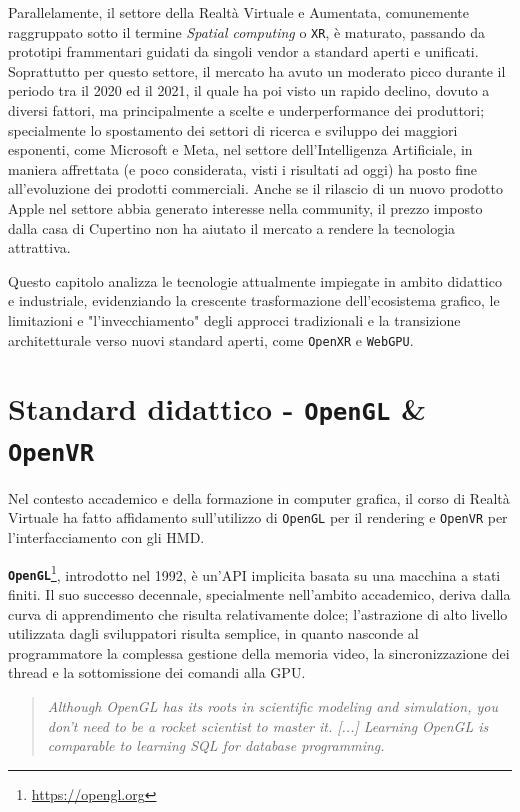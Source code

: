 \documentclass[a4paper, 11pt, twoside]{report}
\begin{document}
Parallelamente, il settore della Realtà Virtuale e Aumentata, comunemente raggruppato sotto il termine \textit{Spatial
computing} o \texttt{XR}, è maturato, passando da prototipi frammentari guidati da singoli vendor a standard aperti e
unificati.
Soprattutto per questo settore, il mercato ha avuto un moderato picco durante il periodo tra il 2020 ed il 2021, il
quale ha poi visto un rapido declino, dovuto a diversi fattori, ma principalmente a scelte e underperformance dei
produttori; specialmente lo spostamento dei settori di ricerca e sviluppo dei maggiori esponenti, come Microsoft e Meta,
nel settore dell'Intelligenza Artificiale, in maniera affrettata (e poco considerata, visti i risultati ad oggi) ha
posto fine all'evoluzione dei prodotti commerciali.
Anche se il rilascio di un nuovo prodotto Apple nel settore abbia generato interesse nella community, il prezzo imposto
dalla casa di Cupertino non ha aiutato il mercato a rendere la tecnologia attrattiva.

Questo capitolo analizza le tecnologie attualmente impiegate in ambito didattico e industriale, evidenziando la
crescente trasformazione dell'ecosistema grafico, le limitazioni e "l'invecchiamento" degli approcci tradizionali e
la transizione architetturale verso nuovi standard aperti, come \texttt{\gls{OpenXR}} e \texttt{WebGPU}.

\newpage

\section{Standard didattico - \texttt{OpenGL} \& \texttt{\gls{OpenVR}}}

Nel contesto accademico e della formazione in computer grafica, il corso di Realtà Virtuale ha fatto affidamento
sull'utilizzo di \texttt{OpenGL} per il rendering e \texttt{\gls{OpenVR}} per l'interfacciamento con gli HMD.

\textbf{\texttt{OpenGL}}\footnote{\url{https://opengl.org}}, introdotto nel 1992, è un'API implicita basata su una
macchina a stati finiti. Il suo successo decennale, specialmente nell'ambito accademico, deriva dalla curva di
apprendimento che risulta relativamente dolce; l'astrazione di alto livello utilizzata dagli sviluppatori risulta
semplice, in quanto nasconde al programmatore la complessa gestione della memoria video, la sincronizzazione dei thread
e la sottomissione dei comandi alla GPU.

\begin{quote}
\itshape
Although OpenGL has its roots in scientific modeling and simulation, you don’t need to be a rocket scientist to master
it. [...] Learning OpenGL is comparable to learning SQL for database programming. \cite{superbible}
\end{quote}
\end{document}
